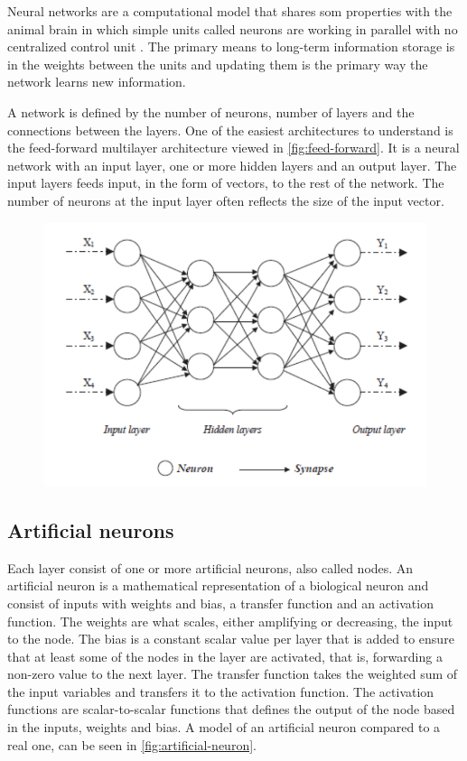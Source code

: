 Neural networks are a computational model that shares som properties with the animal brain in which simple units called neurons are working in parallel with no centralized control unit \cite{Patterson2017}. The primary means to long-term information storage is in the weights between the units and updating them is the primary way the network learns new information.

A network is defined by the number of neurons, number of layers and the connections between the layers. One of the easiest architectures to understand is the feed-forward multilayer architecture viewed in \autoref{fig:feed-forward}. It is a neural network with an input layer, one or more hidden layers and an output layer. The input layers feeds input, in the form of vectors, to the rest of the network. The number of neurons at the input layer often reflects the size of the input vector.

\begin{figure}[H]
	\centering
	\includegraphics[width=0.8\linewidth]{fig/feedforward-neural-network.png}
	\label{fig:feed-forward}
\end{figure}

\subsection{Artificial neurons}
Each layer consist of one or more artificial neurons, also called nodes. An artificial neuron is a mathematical representation of a biological neuron and consist of inputs with weights and bias, a transfer function and an activation function. The weights are what scales, either amplifying or decreasing, the input to the node. The bias is a constant scalar value per layer that is added to ensure that at least some of the nodes in the layer are activated, that is, forwarding a non-zero value to the next layer. The transfer function takes the weighted sum of the input variables and transfers it to the activation function. The activation functions are scalar-to-scalar functions that defines the output of the node based in the inputs, weights and bias. A model of an artificial neuron compared to a real one, can be seen in \autoref{fig:artificial-neuron}. 



